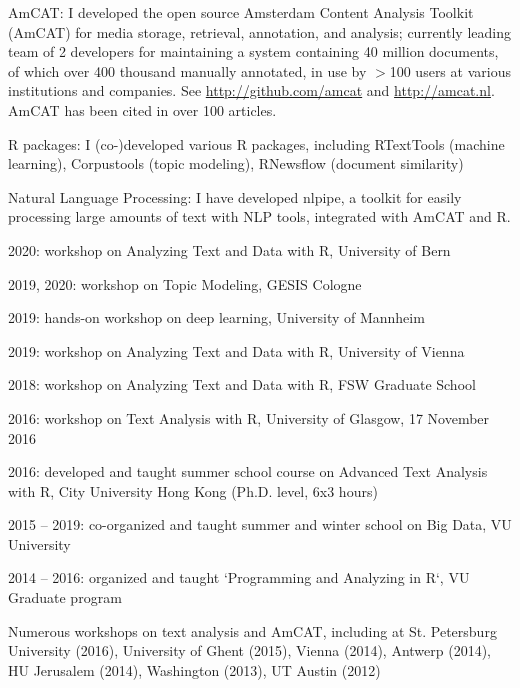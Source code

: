 \documentclass[a4paper,11pt]{article}
\begin{document}
{

{\item AmCAT: I developed the open source Amsterdam Content Analysis Toolkit (AmCAT) 
for media storage, retrieval, annotation, and analysis; currently leading team of
2 developers for maintaining a system containing 40 million documents,
of which over 400 thousand manually annotated, in use by $>$100 users
at various institutions and companies. See
\url{http://github.com/amcat} and \url{http://amcat.nl}.
AmCAT has been cited in over 100 articles.
\item R packages: I (co-)developed various R packages, including RTextTools (machine learning), Corpustools (topic modeling), RNewsflow (document similarity)
\item Natural Language Processing: I have developed nlpipe, a toolkit for easily processing large amounts of text with NLP tools, integrated with AmCAT and R.  
}


 {
\item 2020: workshop on Analyzing Text and Data with R, University of Bern
\item 2019, 2020: workshop on Topic Modeling, GESIS Cologne
\item 2019: hands-on workshop on deep learning, University of Mannheim 
\item 2019: workshop on Analyzing Text and Data with R, University of Vienna
\item 2018: workshop on Analyzing Text and Data with R, FSW Graduate School
\item 2016: workshop on Text Analysis with R, University of Glasgow, 17 November 2016
\item 2016: developed and taught summer school course on Advanced Text Analysis with R, City University Hong Kong (Ph.D. level, 6x3 hours)
\item 2015 -- 2019: co-organized and taught summer and winter school on Big Data, VU University
\item 2014 -- 2016: organized and taught `Programming and Analyzing in R`, VU Graduate program 
\item Numerous workshops on text analysis and AmCAT, including at St. Petersburg University (2016), University of Ghent
(2015), Vienna (2014), Antwerp (2014), HU Jerusalem (2014), Washington (2013),
UT Austin (2012)
}

}
\end{document}
